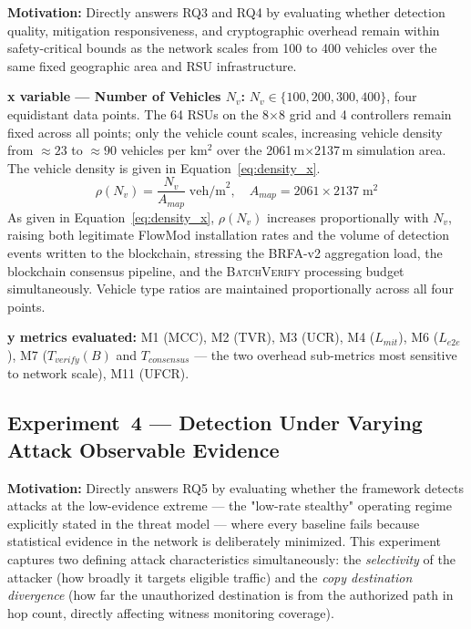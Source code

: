 \documentclass[12pt, a4paper]{report}
\begin{document}
{{\textbf{Motivation:} Directly answers RQ3 and RQ4
by evaluating whether detection quality, mitigation
responsiveness, and cryptographic overhead remain
within safety-critical bounds as the network scales
from 100 to 400 vehicles over the same fixed
geographic area and \ac{RSU} infrastructure.

\textbf{x variable — Number of Vehicles $N_v$:}
$N_v \in \{100, 200, 300, 400\}$, four equidistant
data points. The 64 \ac{RSU}s on the 8$\times$8
grid and 4 controllers remain fixed across all
points; only the vehicle count scales, increasing
vehicle density from $\approx 23$ to $\approx 90$
vehicles per km$^2$ over the
2061\,m$\times$2137\,m simulation area.
The vehicle density is given in
Equation~\eqref{eq:density_x}.
\begin{equation}
\rho(N_v) =
\frac{N_v}{A_{map}}
\;\text{veh/m}^2,
\quad A_{map} = 2061 \times 2137\;\text{m}^2
\label{eq:density_x}
\end{equation}
As given in Equation~\eqref{eq:density_x},
$\rho(N_v)$ increases proportionally with $N_v$,
raising both legitimate FlowMod installation rates
and the volume of detection events written to the
blockchain, stressing the BRFA-v2 aggregation load,
the blockchain consensus pipeline, and the
\textsc{BatchVerify} processing budget simultaneously.
Vehicle type ratios are maintained proportionally
across all four points.

\textbf{y metrics evaluated:}
M1 (MCC), M2 (TVR), M3 (UCR), M4 ($L_{mit}$),
M6 ($L_{e2e}$), M7 ($T_{verify}(B)$ and
$T_{consensus}$ — the two overhead sub-metrics
most sensitive to network scale), M11 (UFCR).



\subsection{Experiment~4 — Detection Under Varying
Attack Observable Evidence}
\label{sec:exp4}

\textbf{Motivation:} Directly answers RQ5 by
evaluating whether the framework detects attacks at
the low-evidence extreme — the "low-rate stealthy"
operating regime explicitly stated in the threat
model — where every baseline fails because
statistical evidence in the network is deliberately
minimized. This experiment captures two defining
attack characteristics simultaneously: the
\textit{selectivity} of the attacker (how broadly
it targets eligible traffic) and the
\textit{copy destination divergence} (how far the
unauthorized destination is from the authorized
path in hop count, directly affecting witness
monitoring coverage).

}}
\end{document}
